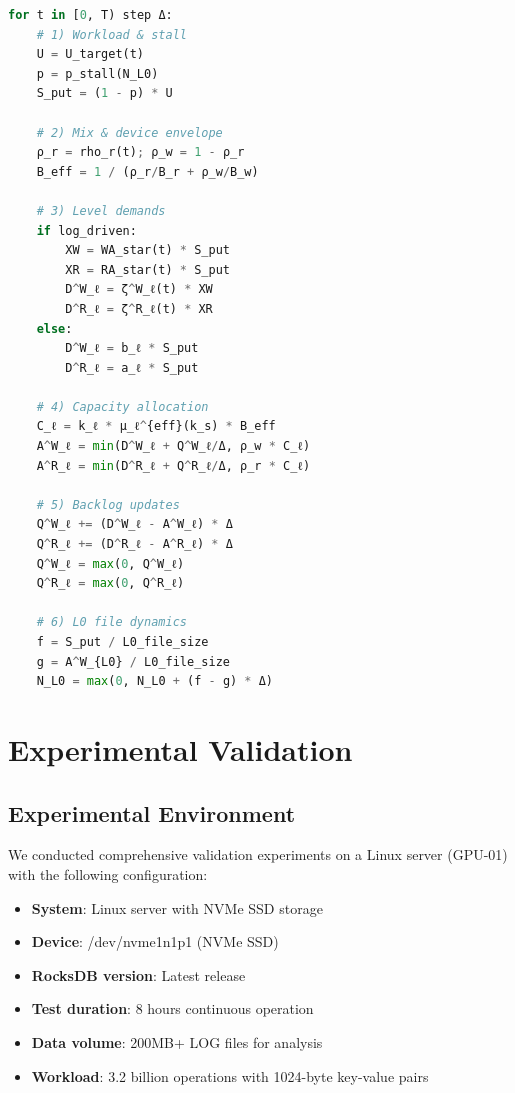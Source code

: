 \documentclass[11pt,twocolumn]{article}
\begin{document}
\begin{lstlisting}[language=Python]
for t in [0, T) step Δ:
    # 1) Workload & stall
    U = U_target(t)
    p = p_stall(N_L0)
    S_put = (1 - p) * U
    
    # 2) Mix & device envelope
    ρ_r = rho_r(t); ρ_w = 1 - ρ_r
    B_eff = 1 / (ρ_r/B_r + ρ_w/B_w)
    
    # 3) Level demands
    if log_driven:
        XW = WA_star(t) * S_put
        XR = RA_star(t) * S_put
        D^W_ℓ = ζ^W_ℓ(t) * XW
        D^R_ℓ = ζ^R_ℓ(t) * XR
    else:
        D^W_ℓ = b_ℓ * S_put
        D^R_ℓ = a_ℓ * S_put
    
    # 4) Capacity allocation
    C_ℓ = k_ℓ * μ_ℓ^{eff}(k_s) * B_eff
    A^W_ℓ = min(D^W_ℓ + Q^W_ℓ/Δ, ρ_w * C_ℓ)
    A^R_ℓ = min(D^R_ℓ + Q^R_ℓ/Δ, ρ_r * C_ℓ)
    
    # 5) Backlog updates
    Q^W_ℓ += (D^W_ℓ - A^W_ℓ) * Δ
    Q^R_ℓ += (D^R_ℓ - A^R_ℓ) * Δ
    Q^W_ℓ = max(0, Q^W_ℓ)
    Q^R_ℓ = max(0, Q^R_ℓ)
    
    # 6) L0 file dynamics
    f = S_put / L0_file_size
    g = A^W_{L0} / L0_file_size
    N_L0 = max(0, N_L0 + (f - g) * Δ)
\end{lstlisting}

\section{Experimental Validation}

\subsection{Experimental Environment}

We conducted comprehensive validation experiments on a Linux server (GPU-01) with the following configuration:

\begin{itemize}
    \item \textbf{System}: Linux server with NVMe SSD storage
    \item \textbf{Device}: /dev/nvme1n1p1 (NVMe SSD)
    \item \textbf{RocksDB version}: Latest release
    \item \textbf{Test duration}: 8 hours continuous operation
    \item \textbf{Data volume}: 200MB+ LOG files for analysis
    \item \textbf{Workload}: 3.2 billion operations with 1024-byte key-value pairs
\end{itemize}
\end{document}
